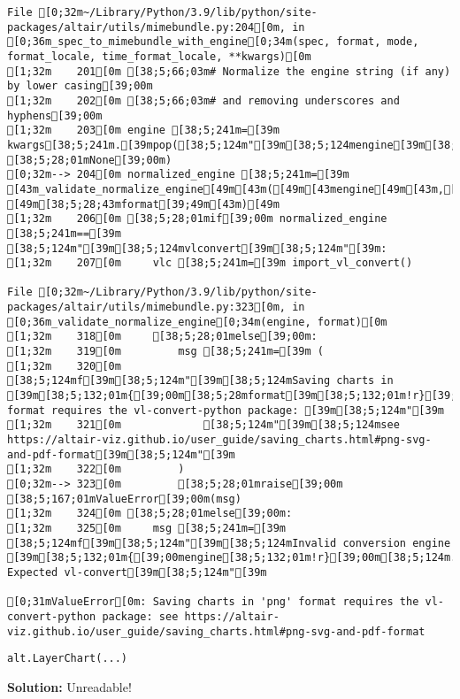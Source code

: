 \documentclass[
  letterpaper,
  DIV=11,
  numbers=noendperiod]{scrartcl}
\begin{document}
\begin{verbatim}
File [0;32m~/Library/Python/3.9/lib/python/site-packages/altair/utils/mimebundle.py:204[0m, in [0;36m_spec_to_mimebundle_with_engine[0;34m(spec, format, mode, format_locale, time_format_locale, **kwargs)[0m
[1;32m    201[0m [38;5;66;03m# Normalize the engine string (if any) by lower casing[39;00m
[1;32m    202[0m [38;5;66;03m# and removing underscores and hyphens[39;00m
[1;32m    203[0m engine [38;5;241m=[39m kwargs[38;5;241m.[39mpop([38;5;124m"[39m[38;5;124mengine[39m[38;5;124m"[39m, [38;5;28;01mNone[39;00m)
[0;32m--> 204[0m normalized_engine [38;5;241m=[39m [43m_validate_normalize_engine[49m[43m([49m[43mengine[49m[43m,[49m[43m [49m[38;5;28;43mformat[39;49m[43m)[49m
[1;32m    206[0m [38;5;28;01mif[39;00m normalized_engine [38;5;241m==[39m [38;5;124m"[39m[38;5;124mvlconvert[39m[38;5;124m"[39m:
[1;32m    207[0m     vlc [38;5;241m=[39m import_vl_convert()

File [0;32m~/Library/Python/3.9/lib/python/site-packages/altair/utils/mimebundle.py:323[0m, in [0;36m_validate_normalize_engine[0;34m(engine, format)[0m
[1;32m    318[0m     [38;5;28;01melse[39;00m:
[1;32m    319[0m         msg [38;5;241m=[39m (
[1;32m    320[0m             [38;5;124mf[39m[38;5;124m"[39m[38;5;124mSaving charts in [39m[38;5;132;01m{[39;00m[38;5;28mformat[39m[38;5;132;01m!r}[39;00m[38;5;124m format requires the vl-convert-python package: [39m[38;5;124m"[39m
[1;32m    321[0m             [38;5;124m"[39m[38;5;124msee https://altair-viz.github.io/user_guide/saving_charts.html#png-svg-and-pdf-format[39m[38;5;124m"[39m
[1;32m    322[0m         )
[0;32m--> 323[0m         [38;5;28;01mraise[39;00m [38;5;167;01mValueError[39;00m(msg)
[1;32m    324[0m [38;5;28;01melse[39;00m:
[1;32m    325[0m     msg [38;5;241m=[39m [38;5;124mf[39m[38;5;124m"[39m[38;5;124mInvalid conversion engine [39m[38;5;132;01m{[39;00mengine[38;5;132;01m!r}[39;00m[38;5;124m. Expected vl-convert[39m[38;5;124m"[39m

[0;31mValueError[0m: Saving charts in 'png' format requires the vl-convert-python package: see https://altair-viz.github.io/user_guide/saving_charts.html#png-svg-and-pdf-format
\end{verbatim}

\begin{verbatim}
alt.LayerChart(...)
\end{verbatim}

\textbf{Solution:} Unreadable!
\end{document}
